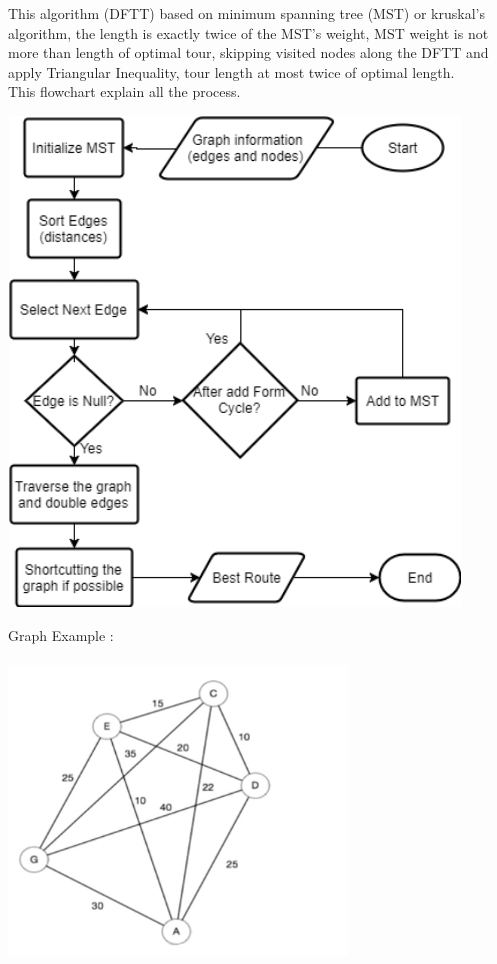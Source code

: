 \documentclass[12pt]{article}
\newcounter{subsubsubsection}[subsubsection]
\begin{document}
\newpage
{}
This algorithm (DFTT) based on minimum spanning tree (MST) or kruskal's algorithm, the length is exactly twice of the MST's weight, MST weight is not more than length of optimal tour, skipping visited nodes along the DFTT and apply Triangular Inequality, tour length at most twice of optimal length.\\
This flowchart explain all the process.\\
\begin{center}
	\includegraphics[width=12cm,height=13cm]{./assets/flowchart/dftt.png}\\
\end{center}
\newpage
Graph Example : \\
\begin{center}
	\includegraphics[width=9cm,height=8cm]{./assets/example/graph-dftt-1.png}\\
\end{center}
\end{document}
